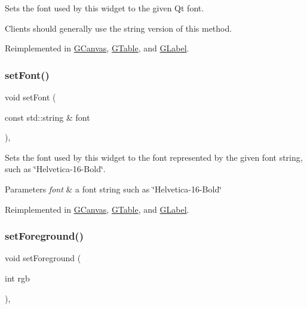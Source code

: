 Sets the font used by this widget to the given Qt font. 

Clients should generally use the string version of this method. 

Reimplemented in \mbox{\hyperlink{classGCanvas_ad1d75b3840a41ba7d1e8a921696dc684}{G\+Canvas}}, \mbox{\hyperlink{classGTable_ad1d75b3840a41ba7d1e8a921696dc684}{G\+Table}}, and \mbox{\hyperlink{classGLabel_ad1d75b3840a41ba7d1e8a921696dc684}{G\+Label}}.

\mbox{\label{classGInteractor_a8e096e8818d838aceae1d46d58fb3a7b}} 
\subsubsection{\texorpdfstring{set\+Font()}{setFont()}\hspace{0.1cm}{\footnotesize\ttfamily [2/2]}}
{\footnotesize\ttfamily void set\+Font (\begin{DoxyParamCaption}\item[{const std\+::string \&}]{font }\end{DoxyParamCaption})\hspace{0.3cm}{\ttfamily [virtual]}, {\ttfamily [inherited]}}



Sets the font used by this widget to the font represented by the given font string, such as \char`\"{}\+Helvetica-\/16-\/\+Bold\char`\"{}. 


\begin{DoxyParams}{Parameters}
{\em font} & a font string such as \char`\"{}\+Helvetica-\/16-\/\+Bold\char`\"{} \\
\hline
\end{DoxyParams}


Reimplemented in \mbox{\hyperlink{classGCanvas_a51367c9fd2709973b1f7238734f93891}{G\+Canvas}}, \mbox{\hyperlink{classGTable_a51367c9fd2709973b1f7238734f93891}{G\+Table}}, and \mbox{\hyperlink{classGLabel_a51367c9fd2709973b1f7238734f93891}{G\+Label}}.

\mbox{\label{classGInteractor_a9eb856b5ff83a19df3831a31f15f4563}} 
\subsubsection{\texorpdfstring{set\+Foreground()}{setForeground()}\hspace{0.1cm}{\footnotesize\ttfamily [1/2]}}
{\footnotesize\ttfamily void set\+Foreground (\begin{DoxyParamCaption}\item[{int}]{rgb }\end{DoxyParamCaption})\hspace{0.3cm}{\ttfamily [virtual]}, {\ttfamily [inherited]}}




